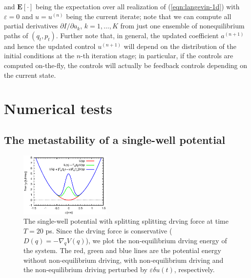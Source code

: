 \documentclass[]{tMPH2e}
\newcommand{\eps}{\varepsilon}
\newcommand{\bE}{{\mathbf E}}
\begin{document}
and $\bE[\cdot]$ being the expectation over all realization of (\ref{eqn:langevin-1d}) with $\eps=0$ and $u=u^{(n)}$ being the current iterate; note that we can compute all partial derivatives $\partial I/\partial a_k$, $k=1,\ldots,K$ from just one ensemble of nonequilibrium paths of $(q_{t},p_{t})$. Further note that, in general, the updated coefficient $a^{(n+1)}$ and hence the updated control $u^{(n+1)}$ will depend on the distribution of the initial conditions at the $n$-th iteration stage; in particular, if the controls are computed on-the-fly, the controls will actually be feedback controls depending on the current state.    





\section{Numerical tests}

\subsection{The metastability of a single-well potential}

\begin{figure}
  \centering
  \includegraphics[width=0.4\textwidth]{figs/fig-split-pot.eps}
  \caption{The single-well potential with splitting splitting drving
    force at time $T = 20$ ps.  Since the drving force is
    conservative ($ D( q) = -\nabla_{q}V( q)$),
    we plot the non-equilibrium drving energy of the system.  The red,
    green and blue lines are the potential energy without
    non-equilibrium driving, with non-equilibrium driving and
    the non-equilibrium driving perturbed by $\eps\delta u(t)$,
    respectively.  }
  \label{fig:tmp4}
\end{figure}
\end{document}
